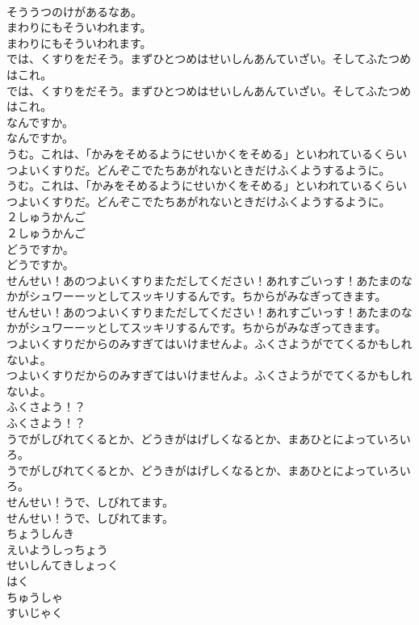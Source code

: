 \documentclass[8pt]{extreport}
\begin{document}
\begin{CJK}{UTF8}{min}
\\	そううつのけがあるなあ。
\\	まわりにもそういわれます。
\\	まわりにもそういわれます。
\\	では、くすりをだそう。まずひとつめはせいしんあんていざい。そしてふたつめはこれ。
\\	では、くすりをだそう。まずひとつめはせいしんあんていざい。そしてふたつめはこれ。
\\	なんですか。
\\	なんですか。
\\	うむ。これは、「かみをそめるようにせいかくをそめる」といわれているくらいつよいくすりだ。どんぞこでたちあがれないときだけふくようするように。
\\	うむ。これは、「かみをそめるようにせいかくをそめる」といわれているくらいつよいくすりだ。どんぞこでたちあがれないときだけふくようするように。
\\	２しゅうかんご
\\	２しゅうかんご
\\	どうですか。
\\	どうですか。
\\	せんせい！あのつよいくすりまただしてください！あれすごいっす！あたまのなかがシュワーーッとしてスッキリするんです。ちからがみなぎってきます。
\\	せんせい！あのつよいくすりまただしてください！あれすごいっす！あたまのなかがシュワーーッとしてスッキリするんです。ちからがみなぎってきます。
\\	つよいくすりだからのみすぎてはいけませんよ。ふくさようがでてくるかもしれないよ。
\\	つよいくすりだからのみすぎてはいけませんよ。ふくさようがでてくるかもしれないよ。
\\	ふくさよう！？
\\	ふくさよう！？
\\	うでがしびれてくるとか、どうきがはげしくなるとか、まあひとによっていろいろ。
\\	うでがしびれてくるとか、どうきがはげしくなるとか、まあひとによっていろいろ。
\\	せんせい！うで、しびれてます。
\\	せんせい！うで、しびれてます。
\\	ちょうしんき
\\	えいようしっちょう
\\	せいしんてきしょっく
\\	はく
\\	ちゅうしゃ
\\	すいじゃく

\end{CJK}
\end{document}
